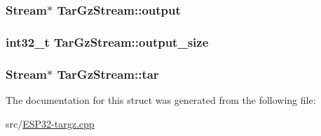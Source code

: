 \subsubsection[{\texorpdfstring{output}{output}}]{\setlength{\rightskip}{0pt plus 5cm}Stream$\ast$ Tar\+Gz\+Stream\+::output}\hypertarget{structTarGzStream_abccaf0e4972ceed18368d19df39d97b2}{}\label{structTarGzStream_abccaf0e4972ceed18368d19df39d97b2}
\subsubsection[{\texorpdfstring{output\+\_\+size}{output_size}}]{\setlength{\rightskip}{0pt plus 5cm}int32\+\_\+t Tar\+Gz\+Stream\+::output\+\_\+size}\hypertarget{structTarGzStream_a38f582283166a6fc9424887aef3c25b8}{}\label{structTarGzStream_a38f582283166a6fc9424887aef3c25b8}
\subsubsection[{\texorpdfstring{tar}{tar}}]{\setlength{\rightskip}{0pt plus 5cm}Stream$\ast$ Tar\+Gz\+Stream\+::tar}\hypertarget{structTarGzStream_a1379631773007f33db4bb41a01526359}{}\label{structTarGzStream_a1379631773007f33db4bb41a01526359}


The documentation for this struct was generated from the following file\+:\begin{DoxyCompactItemize}
\item 
src/\hyperlink{ESP32-targz_8cpp}{E\+S\+P32-\/targz.\+cpp}\end{DoxyCompactItemize}
